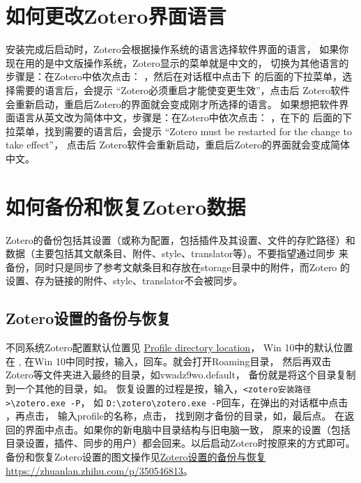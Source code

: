 \documentclass[cn,11pt,chinese]{elegantbook}
\begin{document}
	\section{如何更改Zotero界面语言} \label{sec:chang_gui_lan}
			安装完成后启动时，Zotero会根据操作系统的语言选择软件界面的语言，
			如果你现在用的是中文版操作系统，Zotero显示的菜单就是中文的，
			切换为其他语言的步骤是：在Zotero中依次点击：
			，然后在对话框中点击下
			的后面的下拉菜单，选择需要的语言后，会提示
			“Zotero必须重启才能使变更生效”，点击后
			Zotero软件会重新启动，重启后Zotero的界面就会变成刚才所选择的语言。
			如果想把软件界面语言从英文改为简体中文，步骤是：在Zotero中依次点击：
			，在下的
			后面的下拉菜单，找到需要的语言后，会提示
			“Zotero must be restarted for the change to take effect”，
			点击后
			Zotero软件会重新启动，重启后Zotero的界面就会变成简体中文。

	\section{如何备份和恢复Zotero数据} \label{sec:back}
 		Zotero的备份包括其设置（或称为配置，包括插件及其设置、文件的存贮路径）和
		数据（主要包括其文献条目、附件、style、translator等）。不要指望通过同步
		来备份，同时只是同步了参考文献条目和存放在storage目录中的附件，而Zotero
		的设置、存为链接的附件、style、translator不会被同步。

		\subsection{Zotero设置的备份与恢复}
					不同系统Zotero配置默认位置见
					\href{https://www.zotero.org/support/kb/profile_directory}{Profile directory location}，
					Win 10中的默认位置在
					,
					在Win 10中同时按，输入，回车。就会打开Roaming目录，
					然后再双击Zotero等文件夹进入最终的目录，如vwadz9wo.default，
					备份就是将这个目录复制到一个其他的目录，如。
					恢复设置的过程是按，输入，\verb|<zotero安装路径>\zotero.exe -P|，
					如 \verb|D:\zotero\zotero.exe -P|回车，在弹出的对话框中点击
					，再点击，
					输入profile的名称，点击，
					找到刚才备份的目录，如，最后点。
					在返回的界面中点击。如果你的新电脑中目录结构与旧电脑一致，
					原来的设置（包括目录设置，插件、同步的用户）都会回来。以后启动Zotero时按原来的方式即可。
					备份和恢复Zotero设置的图文操作见\href{https://zhuanlan.zhihu.com/p/350546813}
					{Zotero设置的备份与恢复https://zhuanlan.zhihu.com/p/350546813}。
\end{document}
